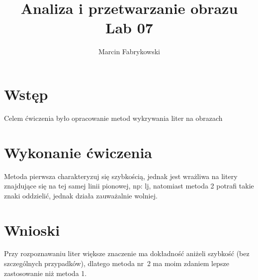 \documentclass[a4paper, 12pt]{article}
\author{Marcin Fabrykowski}
\title{Analiza i przetwarzanie obrazu\\Lab 07}
\begin{document}
\maketitle
\newpage
\section{Wstęp}
Celem ćwiczenia było opracowanie metod wykrywania liter na obrazach
\section{Wykonanie ćwiczenia}
Metoda pierwsza charakteryzuj się szybkością, jednak jest wrażliwa na litery znajdujące się na tej samej linii pionowej, np: lj, natomiast metoda 2 potrafi takie znaki oddzielić, jednak działa zauważalnie wolniej.
\section{Wnioski}
Przy rozpoznawaniu liter większe znaczenie ma dokładność aniżeli szybkość (bez szczególnych przypadków), dlatego metoda nr~2 ma moim zdaniem lepsze zastosowanie niż metoda 1.
\end{document}
